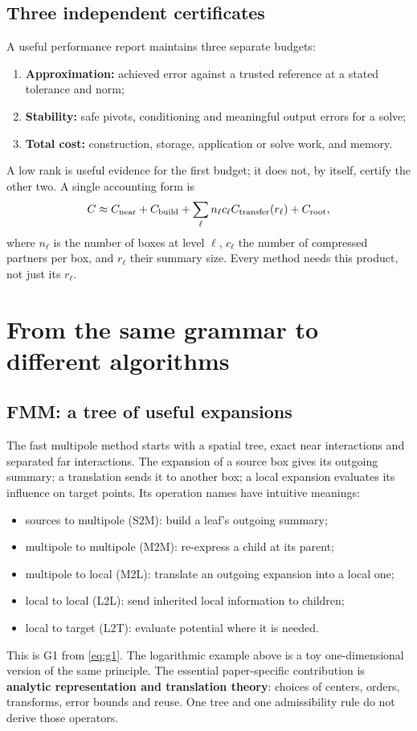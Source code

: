 \subsection{Three independent certificates}
A useful performance report maintains three separate budgets:
\begin{enumerate}
 \item \textbf{Approximation:} achieved error against a trusted reference at a stated tolerance and norm;
 \item \textbf{Stability:} safe pivots, conditioning and meaningful output errors for a solve;
 \item \textbf{Total cost:} construction, storage, application or solve work, and memory.
\end{enumerate}
A low rank is useful evidence for the first budget; it does not, by itself, certify the other two. A single accounting form is
\begin{equation}
 C\approx C_{\rm near}+C_{\rm build}
 +\sum_{\ell}n_\ell c_\ell C_{\rm transfer}(r_\ell)+C_{\rm root},
 \label{eq:costaccounting}
\end{equation}
where $n_\ell$ is the number of boxes at level $\ell$, $c_\ell$ the number of compressed partners per box, and $r_\ell$ their summary size. Every method needs this product, not just its $r_\ell$.

\section{From the same grammar to different algorithms}
\label{sec:algorithms}

\subsection{FMM: a tree of useful expansions}
The fast multipole method starts with a spatial tree, exact near interactions and separated far interactions. The expansion of a source box gives its outgoing summary; a translation sends it to another box; a local expansion evaluates its influence on target points. Its operation names have intuitive meanings:
\begin{itemize}
 \item sources to multipole (S2M): build a leaf's outgoing summary;
 \item multipole to multipole (M2M): re-express a child at its parent;
 \item multipole to local (M2L): translate an outgoing expansion into a local one;
 \item local to local (L2L): send inherited local information to children;
 \item local to target (L2T): evaluate potential where it is needed.
\end{itemize}
This is G1 from \eqref{eq:g1}. The logarithmic example above is a toy one-dimensional version of the same principle. The essential paper-specific contribution is \textbf{analytic representation and translation theory}: choices of centers, orders, transforms, error bounds and reuse. One tree and one admissibility rule do not derive those operators.

